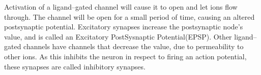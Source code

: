 Activation of a ligand--gated channel will cause it to open and let ions flow through. %
The channel will be open for a small period of time, causing an altered postsynaptic potential.
Excitatory synapses increase the postsynaptic node's value, and is called an Excitatory PostSysnaptic Potential(EPSP). %
Other ligand--gated channels have channels that decrease the value, due to permeability to other ions.
As this inhibits the neuron in respect to firing an action potential, these synapses are called inhibitory synapses\cite{PrinciplesOfNeuralScience4edKAP07}.





